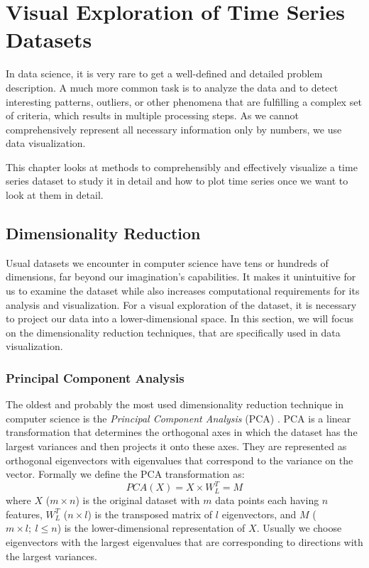 \chapter{Visual Exploration of Time Series Datasets}
In data science, it is very rare to get a well-defined and detailed problem description. A much more common task is to analyze the data and to detect interesting patterns, outliers, or other phenomena that are fulfilling a complex set of criteria, which results in multiple processing steps. As we cannot comprehensively represent all necessary information only by numbers, we use data visualization. 

This chapter looks at methods to comprehensibly and effectively visualize a time series dataset to study it in detail and how to plot time series once we want to look at them in detail.

\section{Dimensionality Reduction}
Usual datasets we encounter in computer science have tens or hundreds of dimensions, far beyond our imagination's capabilities. It makes it unintuitive for us to examine the dataset while also increases computational requirements for its analysis and visualization. For a visual exploration of the dataset, it is necessary to project our data into a lower-dimensional space. In this section, we will focus on the dimensionality reduction techniques, that are specifically used in data visualization.

\subsection{Principal Component Analysis}
The oldest and probably the most used dimensionality reduction technique in computer science is the \textit{Principal Component Analysis} (PCA) \cite{vis:pca}. PCA is a linear transformation that determines the orthogonal axes in which the dataset has the largest variances and then projects it onto these axes. They are represented as orthogonal eigenvectors with eigenvalues that correspond to the variance on the vector. Formally we define the PCA transformation as:
\begin{equation}
    PCA(X) = X \times W_L^T = M
\end{equation}
where $X$ ($m \times n$) is the original dataset with $m$ data points each having $n$ features, $W^T_L$ ($n \times l$) is the transposed matrix of $l$ eigenvectors, and $M$ ($m \times l;~ l \leq n$) is the lower-dimensional representation of $X$. Usually we choose eigenvectors with the largest eigenvalues that are corresponding to directions with the largest variances.

